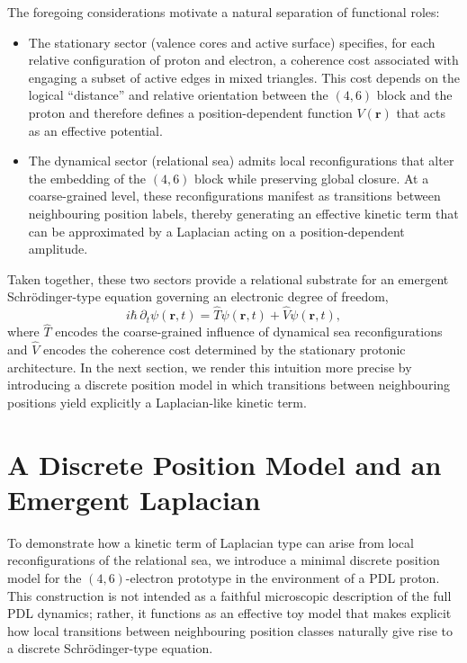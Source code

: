 \documentclass[11pt,a4paper]{article}
\begin{document}
The foregoing considerations motivate a natural separation of functional roles:
\begin{itemize}
\item The stationary sector (valence cores and active surface) specifies, for each relative configuration of proton and electron, a coherence cost associated with engaging a subset of active edges in mixed triangles. This cost depends on the logical ``distance'' and relative orientation between the $(4,6)$ block and the proton and therefore defines a position-dependent function $V(\mathbf{r})$ that acts as an effective potential.
\item The dynamical sector (relational sea) admits local reconfigurations that alter the embedding of the $(4,6)$ block while preserving global closure. At a coarse-grained level, these reconfigurations manifest as transitions between neighbouring position labels, thereby generating an effective kinetic term that can be approximated by a Laplacian acting on a position-dependent amplitude.
\end{itemize}
Taken together, these two sectors provide a relational substrate for an emergent Schr\"odinger-type equation governing an electronic degree of freedom,
\begin{equation}
i\hbar\,\partial_t \psi(\mathbf{r},t) = \hat{T}\psi(\mathbf{r},t) + \hat{V}\psi(\mathbf{r},t),
\end{equation}
where $\hat{T}$ encodes the coarse-grained influence of dynamical sea reconfigurations and $\hat{V}$ encodes the coherence cost determined by the stationary protonic architecture. In the next section, we render this intuition more precise by introducing a discrete position model in which transitions between neighbouring positions yield explicitly a Laplacian-like kinetic term.

\section{A Discrete Position Model and an Emergent Laplacian}
\label{sec:DiscreteLaplacian}

To demonstrate how a kinetic term of Laplacian type can arise from local reconfigurations of the relational sea, we introduce a minimal discrete position model for the $(4,6)$-electron prototype in the environment of a PDL proton. This construction is not intended as a faithful microscopic description of the full PDL dynamics; rather, it functions as an effective toy model that makes explicit how local transitions between neighbouring position classes naturally give rise to a discrete Schr\"odinger-type equation.
\end{document}
